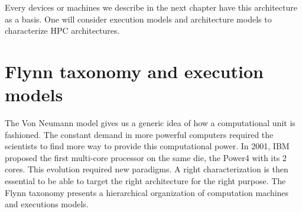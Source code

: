 Every devices or machines we describe in the next chapter have this architecture as a basis. 
One will consider execution models and architecture models to characterize HPC architectures.

\section{Flynn taxonomy and execution models}
The Von Neumann model gives us a generic idea of how a computational unit is fashioned. 
The constant demand in more powerful computers required the scientists to find more way to provide this computational power.
In 2001, IBM proposed the first multi-core processor on the same die, the Power4 with its 2 cores.
This evolution required new paradigms.
A right characterization is then essential to be able to target the right architecture for the right purpose. 
The Flynn taxonomy presents a hierarchical organization of computation machines and executions models.

\begin{table}
\centering
{}
\caption{Flynn taxonomy for execution models completed with SPMD and SIMT models}
\label{tab:1_HPC:taxonomy_flynn}
\end{table}

